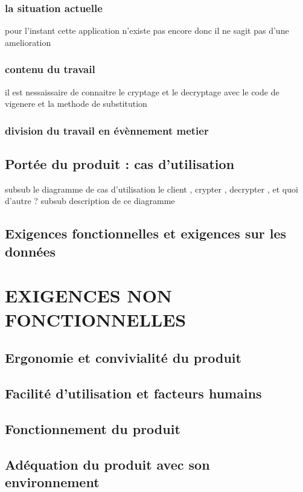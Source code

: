 \documentclass[a4]{article}
\begin{document}
			\subsubsection{la situation actuelle}
				pour l'instant cette application n'existe pas encore 
				donc il ne sagit pas d'une amelioration
			\subsubsection{contenu du travail}
				il est nessaissaire de connaitre le cryptage et le decryptage avec 
				le code de vigenere et la methode de substitution
			\subsubsection{division du travail en évènnement metier}
		\subsection{Portée du produit : cas d’utilisation}
			subsub
				le diagramme de cas d'utilisation
				le client , crypter , decrypter , et quoi d'autre ?
			subsub 
				description de ce diagramme
		\subsection{Exigences fonctionnelles et exigences sur les données}
	\section{EXIGENCES NON FONCTIONNELLES}
		\subsection{Ergonomie et convivialité du produit}
		\subsection{Facilité d’utilisation et facteurs humains}
		\subsection{Fonctionnement du produit}
		\subsection{Adéquation du produit avec son environnement}
\end{document}
